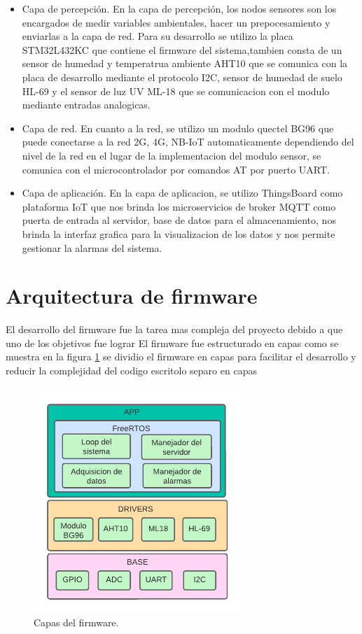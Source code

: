 \begin{itemize}
	\item Capa de percepción. En la capa de percepción, los nodos sensores son los encargados de medir variables ambientales, hacer un prepocesamiento y enviarlas a la capa de red. Para su desarrollo se utilizo la placa STM32L432KC que contiene el firmware del sistema,tambien consta de un sensor de humedad y temperatrua ambiente AHT10 que se comunica con la placa de desarrollo mediante el protocolo I2C, sensor de humedad de suelo HL-69 y el sensor de luz UV ML-18 que se comunicacion con el modulo mediante entradas analogicas.
  \item Capa de red. En cuanto a la red, se utilizo un modulo quectel BG96 que puede conectarse a la red 2G, 4G, NB-IoT automaticamente dependiendo del nivel de la red en el lugar de la implementacion del modulo sensor, se comunica con el microcontrolador por comandos AT por puerto UART.
  \item Capa de aplicación. En la capa de aplicacion, se utilizo ThingsBoard como plataforma IoT que nos brinda los microservicios de broker MQTT como puerta de entrada al servidor, base de datos para el almacenamiento, nos brinda la interfaz grafica para la visualizacion de los datos y nos permite gestionar la alarmas del sistema.


\end{itemize}

\section{Arquitectura de firmware}
El desarrollo del firmware fue la tarea mas compleja del proyecto debido a que uno de los objetivos fue lograr 
El firmware fue estructurado en capas como se muestra en la figura \ref{fig:Capas del firmware} se dividio el firmware en capas para facilitar el desarrollo y reducir la complejidad del codigo escritolo separo en capas 

\begin{figure}[htbp]
  \centering
	\includegraphics[width=0.7\textwidth]{./Figures/Capas del firmware.png}
	\caption{Capas del firmware.}
	\label{fig:Capas del firmware}
\end{figure}

